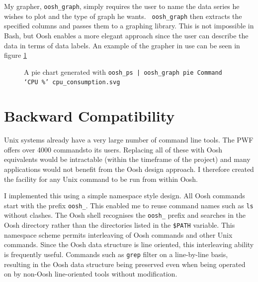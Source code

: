 \documentclass[12pt,twoside,notitlepage]{report}
\begin{document}
My grapher, {\tt oosh\_graph}, simply requires the user to name the
data series he wishes to plot and the type of graph he wants. {\tt
  oosh\_graph} then extracts the specified columns and passes them to
a graphing library. This is not impossible in Bash, but Oosh enables a
more elegant approach since the user can describe the data in terms of
data labels. An example of the grapher in use can be seen in figure
\ref{piegraph}

\begin{figure}[h]
  \centering
  \setlength\fboxsep{0.5pt}
  \setlength\fboxrule{0.5pt}
  \caption{A pie chart generated with {\tt oosh\_ps | oosh\_graph pie
      Command `CPU \%' cpu\_consumption.svg}}
  \label{piegraph}
\end{figure}

\section{Backward Compatibility}

Unix systems already have a very large number of command line
tools. The PWF offers over 4000 commands\footnotemark[3] to its
users. Replacing all of these with Oosh equivalents would be
intractable (within the timeframe of the project) and many
applications would not benefit from the Oosh design approach. I
therefore created the facility for any Unix command to be run from
within Oosh.


I implemented this using a simple namespace style design. All Oosh
commands start with the prefix {\tt oosh\_}. This enabled me to reuse
command names such as {\tt ls} without clashes. The Oosh shell
recognises the {\tt oosh\_} prefix and searches in the Oosh directory
rather than the directories listed in the {\tt \$PATH} variable. This
namespace scheme permits interleaving of Oosh commands and other Unix
commands. Since the Oosh data structure is line oriented, this
interleaving ability is frequently useful. Commands such as {\tt grep}
filter on a line-by-line basis, resulting in the Oosh data structure
being preserved even when being operated on by non-Oosh line-oriented
tools without modification.
\end{document}
